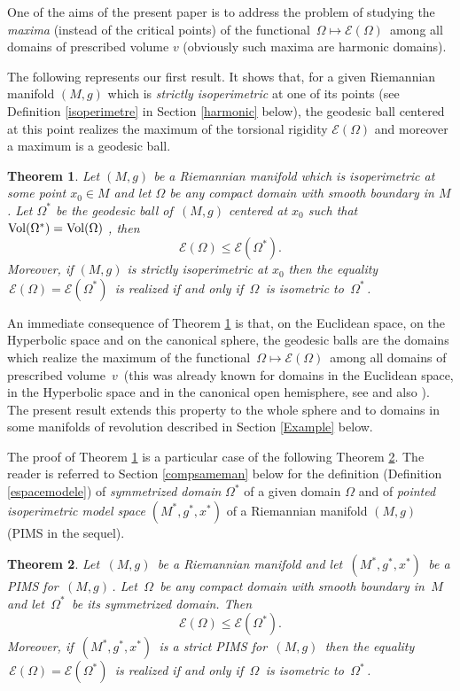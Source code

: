 \documentclass[11pt, reqno]{amsart}
\newtheorem{theoreme}{Theorem}[section]
\theoremstyle{plain}
\begin{document}
\vskip 0.3cm
One of the aims of  the present  paper is to address the problem of studying the {\em maxima}  (instead of the critical points) of the functional
$\,\Omega \mapsto {\mathcal E} (\Omega)\,$ 
among all domains of prescribed volume $v$ (obviously such maxima are harmonic domains).

The following  represents our first result.
It shows that, for a given Riemannian manifold $(M, g)$ which is  {\em strictly  isoperimetric} at one of its points (see Definition \ref{isoperimetre}
 in Section \ref{harmonic} below), the geodesic ball centered at this point  realizes the  maximum  of the torsional rigidity ${\mathcal E} (\Omega)$ 
and moreover a maximum is a geodesic ball.

\begin{theoreme}\label{comparaison1}
Let $(M, g)$ be a Riemannian manifold  which is  isoperimetric at some point $x_0 \in M$ and let $\Omega$ be any compact domain with smooth boundary in $M$.
Let  $\Omega^*$  be  the geodesic ball of $\,(M, g)$ centered at $x_0$ such that ${\rm Vol} (\Omega^*) = {\rm Vol} (\Omega)$ ,
then $${\mathcal E} (\Omega) \le {\mathcal E} (\Omega^*).$$
Moreover, if $(M, g)$ is strictly isoperimetric at $x_0$ then the equality 
$\,{\mathcal E} (\Omega) = {\mathcal E} (\Omega^*)\,$ is realized if and only if $\,\Omega\,$ is isometric to $\,\Omega^*\,$.
\end{theoreme}

An immediate consequence of Theorem \ref{comparaison1} is that, on the Euclidean space, on the Hyperbolic space and on the 
canonical sphere, the geodesic balls are the domains which realize the maximum
of the functional $\,\Omega \mapsto {\mathcal E} (\Omega)\,$ among all domains of prescribed 
volume $\,v\,$ (this was already known for domains in  the Euclidean space, in the Hyperbolic space 
and in the canonical open hemisphere, see \cite{MD} and also \cite{Ca}). The present result extends this property
to the whole sphere and to domains in some manifolds of revolution described in Section \ref{Example}
below.

The proof of Theorem \ref{comparaison1} is a particular case of the following Theorem \ref{comparaison}. 
The reader is referred to Section \ref{compsameman} below for the definition (Definition \ref{espacemodele}) 
of {\em symmetrized domain}  $\Omega^*$ of a given domain $\Omega$  and  of {\em pointed isoperimetric model space} $(M^*, g^*, x^*)$
 of a Riemannian manifold $(M, g)$ (PIMS in the sequel).

\begin{theoreme}\label{comparaison}
Let $\,(M,g)\,$ be a Riemannian manifold and let $\,(M^*,g^*, x^*)\,$ be a PIMS
for $\,(M,g)\,$.
Let $\,\Omega \,$ be any compact domain with smooth boundary in $\, M \,$ 
and  let $\,\Omega^*\,$ 
be its symmetrized domain.
Then
$${\mathcal E} (\Omega) \le {\mathcal E} (\Omega^*).$$
Moreover, if $\,(M^*,g^*, x^*)\,$ is a strict PIMS
for $\,(M,g)\,$ then the equality 
$\,{\mathcal E} (\Omega) = {\mathcal E} (\Omega^*)\,$ is realized if and only if $\,\Omega\,$
is isometric to $\,\Omega^*\,$.
\end{theoreme}
\end{document}
